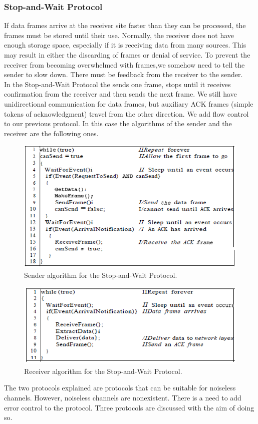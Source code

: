 \subsubsection{Stop-and-Wait Protocol}
If data frames arrive at the receiver site faster than they can be processed, the frames
must be stored until their use. Normally, the receiver does not have enough storage
space, especially if it is receiving data from many sources. This may result in either the
discarding of frames or denial of service. To prevent the receiver from becoming overwhelmed
with frames,we somehow need to tell the sender to slow down. There must be
feedback from the receiver to the sender.\\
In the Stop-and-Wait Protocol the sends one frame, stops until it receives confirmation from the receiver and then sends the next frame. We still have unidirectional communication
for data frames, but auxiliary ACK frames (simple tokens of acknowledgment) travel
from the other direction. We add flow control to our previous protocol. In this case the algorithms of the sender and the receiver are the following ones. 
\begin{figure}[H]
\begin{center}
\includegraphics[scale=1]{sendersawp.PNG} 
\caption{Sender algorithm for the Stop-and-Wait Protocol.}
\end{center}
\end{figure} 
\begin{figure}[H]
\begin{center}
\includegraphics[scale=1]{receiversawp.PNG} 
\caption{Receiver algorithm for the Stop-and-Wait Protocol.}
\end{center}
\end{figure}
The two protocols explained are protocols that can be suitable for noiseless channels. However, noiseless channels are nonexistent. There is a need to add error control to the protocol. Three protocols are discussed with the aim of doing so.
